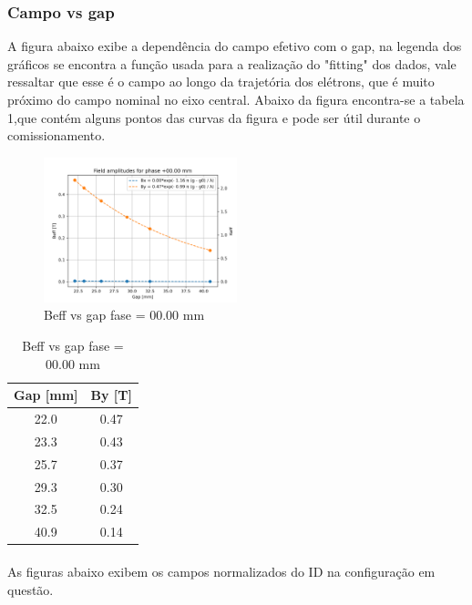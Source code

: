 \documentclass[a4paper,12pt]{article}
\begin{document}
\subsubsection{Campo vs gap}
A figura abaixo exibe a dependência do campo efetivo com o gap, na legenda dos gráficos se encontra a função usada para a realização do "fitting" dos dados, vale ressaltar que esse é o campo ao longo da trajetória dos elétrons, que é muito próximo do campo nominal no eixo central. Abaixo da figura encontra-se a tabela 1,que contém alguns pontos das curvas da figura e pode ser útil durante o comissionamento.
\begin{figure}[H]
\hspace{4cm}
\includegraphics[width=0.5\textwidth]{figs/phase0 B vs gap.png}
\caption{Beff vs gap fase = 00.00 mm}
\label{fig:fieldgap0}
\end{figure}

\begin{table}[H]
\caption{Beff vs gap fase = 00.00 mm}
\centering
\begin{tabular}{|c|c|}
\hline
   Gap [mm] &   By [T] \\
\hline
       22.0 &             0.47 \\
       23.3 &             0.43 \\
       25.7 &             0.37 \\
       29.3 &             0.30  \\
       32.5 &             0.24 \\
       40.9 &             0.14 \\
\hline
\end{tabular}
\end{table}

\paragraph{} As figuras abaixo exibem os campos normalizados do ID na configuração em questão.
\end{document}
